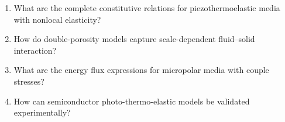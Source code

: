 \begin{enumerate}[label=\textbf{OQ5.\arabic*}]
\item What are the complete constitutive relations for piezothermoelastic media with nonlocal elasticity? \\ \label{oq:5.1}
\item How do double-porosity models capture scale-dependent fluid--solid interaction? \\ \label{oq:5.2}
\item What are the energy flux expressions for micropolar media with couple stresses? \\ \label{oq:5.3}
\item How can semiconductor photo-thermo-elastic models be validated experimentally? \\ \label{oq:5.4}
\end{enumerate}


